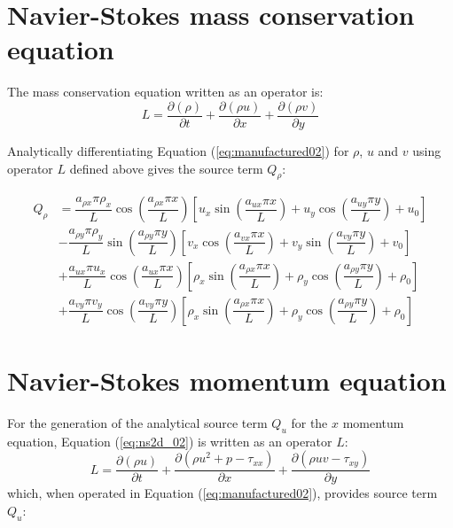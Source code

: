 \documentclass[10pt]{article}
\newcommand{\Diff}[2] {\dfrac{\partial( #1)}{\partial #2}}
\begin{document}
\begin{landscape}
\section{Navier-Stokes mass conservation equation}

The mass conservation equation written as an operator is:
\begin{equation}
 \label{eq:ns2d_11}
L= \Diff{\rho}{t} + \Diff{\rho u}{x}+\Diff{\rho v}{y} 
\end{equation}

Analytically differentiating Equation (\ref{eq:manufactured02}) for $\rho$, $u$ and $v$ using operator $L$ defined above gives  the source term $Q_{\rho}$:

\begin{equation}
\begin{split}
Q_{\rho} &= \dfrac{a_{\rho x}  \pi \rho_{x} }{L} \cos\left(\dfrac{ a_{\rho   x}\pi x}{L}\right)\left[u_x  \sin\left( \dfrac{a_{ux} \pi x}{L} \right) +u_y  \cos \left( \dfrac{a_{uy} \pi y}{L} \right) +u_ 0\right] \\
%
&-\dfrac{a_{\rho y} \pi  \rho _{y} }{L}\sin\left(\dfrac{a_{\rho   y}\pi y }{L}\right)\left[v_x  \cos \left( \dfrac{a_{vx} \pi x}{L} \right) +v_y  \sin\left( \dfrac{a_{vy} \pi y}{L} \right) +v_ 0\right]\\
%
&+\dfrac{ a_{u  x} \pi  u_{x} }{L}\cos\left(\dfrac{ a_{u  x}\pi x}{L}\right)\left[\rho_x \sin\left(\dfrac{a_{\rho x} \pi x}{L}\right) + \rho_y \cos\left(\dfrac{a_{\rho y} \pi y}{L}\right) + \rho_0\right] \\
%
&+\dfrac{a_{v  y} \pi  v_{y} }{L}\cos\left(\dfrac{ a_{v  y}\pi y}{L}\right)\left[\rho_x \sin\left(\dfrac{a_{\rho x} \pi x}{L}\right) + \rho_y \cos\left(\dfrac{a_{\rho y} \pi y}{L}\right) + \rho_0\right]
\end{split}
\end{equation}


\section{Navier-Stokes momentum equation}

For the generation of the analytical source term $Q_u$ for the $x$ momentum equation, Equation  (\ref{eq:ns2d_02}) is written as an  operator $L$:
\begin{equation}
 \label{eq:ns2d_12}
L=\Diff{\rho u}{t} + \Diff{\rho u^2 + p - \tau_{xx}}{x}+\Diff{\rho uv-\tau_{xy}}{y}
\end{equation}
which, when operated in Equation (\ref{eq:manufactured02}), provides source term $Q_{u}$:



\end{landscape}
\end{document}
